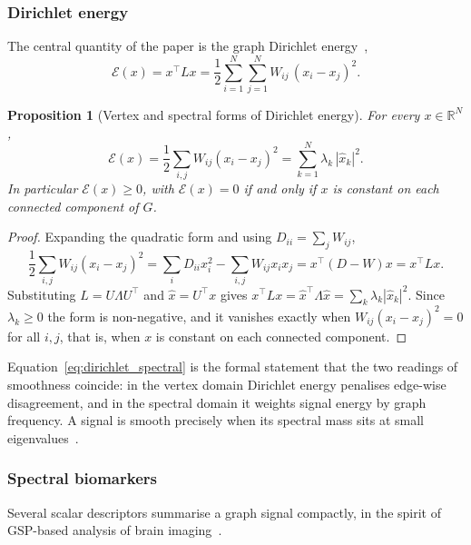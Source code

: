 \documentclass[11pt,reqno]{amsart}
\theoremstyle{plain}
\newtheorem{proposition}[theorem]{Proposition}
\theoremstyle{definition}
\theoremstyle{remark}
\numberwithin{equation}{section}
\newcommand{\R}{\mathbb{R}}
\begin{document}
\subsubsection{Dirichlet energy}

The central quantity of the paper is the graph Dirichlet
energy~\cite{shuman2013emerging,zhou2004learning},
\begin{equation}
\label{eq:dirichlet_energy}
\mathcal{E}(x) = x^{\top} L x
= \frac{1}{2}\sum_{i=1}^{N}\sum_{j=1}^{N} W_{ij}\,(x_i-x_j)^2 .
\end{equation}

\begin{proposition}[Vertex and spectral forms of Dirichlet energy]
\label{prop:dirichlet_forms}
For every $x\in\R^{N}$,
\begin{equation}
\label{eq:dirichlet_spectral}
\mathcal{E}(x)
= \frac{1}{2}\sum_{i,j} W_{ij}(x_i-x_j)^2
= \sum_{k=1}^{N} \lambda_k \,|\hat x_k|^2 .
\end{equation}
In particular $\mathcal{E}(x)\ge 0$, with $\mathcal{E}(x)=0$ if and only if $x$
is constant on each connected component of $G$.
\end{proposition}

\begin{proof}
Expanding the quadratic form and using $D_{ii}=\sum_j W_{ij}$,
\[
\frac{1}{2}\sum_{i,j} W_{ij}(x_i-x_j)^2
= \sum_{i} D_{ii}x_i^2 - \sum_{i,j} W_{ij} x_i x_j
= x^{\top}(D-W)x = x^{\top} L x .
\]
Substituting $L=U\Lambda U^{\top}$ and $\hat x = U^{\top}x$ gives
$x^{\top}L x = \hat x^{\top}\Lambda\hat x = \sum_k \lambda_k|\hat x_k|^2$. Since
$\lambda_k\ge0$ the form is non-negative, and it vanishes exactly when
$W_{ij}(x_i-x_j)^2=0$ for all $i,j$, that is, when $x$ is constant on each
connected component.
\end{proof}

Equation~\eqref{eq:dirichlet_spectral} is the formal statement that the two
readings of smoothness coincide: in the vertex domain Dirichlet energy penalises
edge-wise disagreement, and in the spectral domain it weights signal energy by
graph frequency. A signal is smooth precisely when its spectral mass sits at
small eigenvalues~\cite{belkin2003laplacian}.

\subsubsection{Spectral biomarkers}

Several scalar descriptors summarise a graph signal compactly, in the spirit of
GSP-based analysis of brain imaging~\cite{huang2018graph,huang2016graph}.
\end{document}
